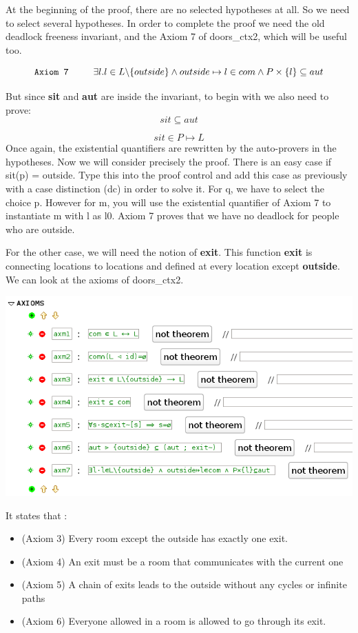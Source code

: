 At the beginning of the proof, there are no selected hypotheses at all. So we need to select several hypotheses. In order to complete the proof we need the old deadlock freeness invariant, and the Axiom 7 of doors\_ctx2, which will be useful too.


\[
\texttt{Axiom 7 \space \space \space \space}\exists l.l \in L \backslash \{outside\} \wedge outside \mapsto l \in com \wedge P \times \{l\} \subseteq aut
\]


But since \textbf{sit} and \textbf{aut} are inside the invariant, to begin with we also need to prove:
\[
sit \subseteq aut
\]

\[
sit \in P \mapsto L
\]
Once again, the existential quantifiers are rewritten by the auto-provers in the hypotheses. Now we will consider precisely the proof. There is an easy case if sit(p) = outside. Type this into the proof control and add this case as previously with a case distinction (dc) in order to solve it. For q, we have to select the choice p. However for m, you will use the existential quantifier of Axiom 7 to instantiate m with l as l0. 
Axiom 7 proves that we have no deadlock for people who are outside.

For the other case, we will need the notion of \textbf{exit}. This function \textbf{exit} is connecting locations to locations and defined at every location except \textbf{outside}. 
We can look at the axioms of doors\_ctx2. 
\begin{center}
	\includegraphics[]{img/tutorial/tut_10_axioms.png}
\end{center}

It states that :

\begin{itemize}
	\item (Axiom 3) Every room except the outside has exactly one exit. 
	\item (Axiom 4) An exit must be a room that communicates with the current one
	\item (Axiom 5) A chain of exits leads to the outside without any cycles or infinite paths
	\item (Axiom 6) Everyone allowed in a room is allowed to go through its exit. 
\end{itemize}  

